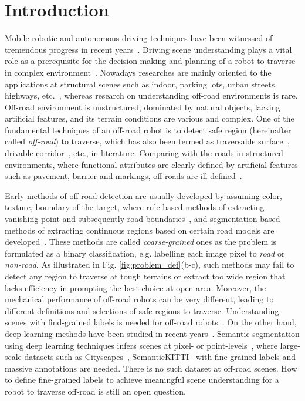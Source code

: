 \documentclass[letterpaper, 10 pt, conference]{ieeeconf}  %
\begin{document}
\section{Introduction}
Mobile robotic and autonomous driving techniques have been witnessed of tremendous progress in recent years~\cite{feng2020deep}. Driving scene understanding plays a vital role as a prerequisite for the decision making and planning of a robot to traverse in complex environment~\cite{badue2020self}.
Nowadays researches are mainly oriented to the applications at structural scenes such as indoor, parking lots, urban streets, highways, etc.~\cite{siam2017deep},
whereas research on understanding off-road environments is rare.
Off-road environment is unstructured, dominated by natural objects, lacking artificial features, and its terrain conditions are various and complex.
One of the fundamental techniques of an off-road robot is to detect safe region (hereinafter called {\it off-road}) to traverse, which has also been termed as traversable surface~\cite{zhou2012self}, drivable corridor~\cite{nefian2006detection}, etc., in literature.
Comparing with the roads in structured environments, where functional attributes are clearly defined by artificial features such as pavement, barrier and markings,
off-roads are ill-defined~\cite{ososinski2015automatic}. 

Early methods of off-road detection are usually developed by assuming color, texture, boundary of the target, where rule-based methods of extracting vanishing point and subsequently road boundaries~\cite{kong2009vanishing}\cite{shi2015fast}, and segmentation-based methods of extracting continuous regions based on certain road models are developed~\cite{alon2006off}\cite{wang2009unstructured}.
These methods are called {\it coarse-grained} ones as the problem is formulated as a binary classification, e.g. labelling each image pixel to {\it road} or {\it non-road}.
As illustrated in Fig. \ref{fig:problem_def}(b-c), such methods may fail to detect any region to traverse at tough terrains or extract too wide region that lacks efficiency in prompting the best choice at open area.
Moreover, the mechanical performance of off-road robots can be very different, leading to different definitions and selections of safe regions to traverse.
Understanding scenes with find-grained labels is needed for off-road robots~\cite{wellhausen2019should}.
On the other hand, deep learning methods have been studied in recent years~\cite{rateke2019passive}. 
Semantic segmentation using deep learning techniques infers scenes at pixel- or point-levels~\cite{long2015fully}, where large-scale datasets such as Cityscapes~\cite{cordts2016cityscapes}, SemanticKITTI~\cite{behley2019semantickitti} with fine-grained labels and massive annotations are needed.
There is no such dataset at off-road scenes. How to define fine-grained labels to achieve meaningful scene understanding for a robot to traverse off-road is still an open question.  
\end{document}
